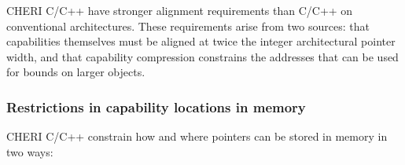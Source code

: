 \documentclass[12pt,twoside,openright,a4paper]{article}
\newcommand{\note}[2]{{\color{blue}[ Note: #1 - #2]}}
\renewcommand{\note}[2]{\relax\ifhmode\unskip\fi}
\newcommand{\amnote}[1]{\note{#1}{Alfredo M.}}
\begin{document}
CHERI C/C++ have stronger alignment requirements than C/C++ on conventional
architectures.
These requirements arise from two sources: that capabilities themselves must
be aligned at twice the integer architectural pointer width, and that
capability compression constrains the addresses that can be used for bounds
on larger objects.
\amnote{Is is worth mentioning compiler flags to warn on excessive padding?
  In particular it seems that it is often the case that the ordering of
  struct elements that was devised for 32bit and 64bit architectures does
  not help much to avoid extra padding with capabilities. It more or less
  depends on how much the pointers are scattered in the struct definition.}

\subsubsection{Restrictions in capability locations in memory}

CHERI C/C++ constrain how and where pointers can be stored in memory in two
ways:
\end{document}
